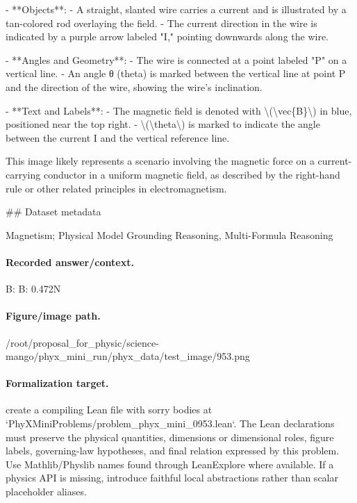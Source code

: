 - **Objects**:
  - A straight, slanted wire carries a current and is illustrated by a tan-colored rod overlaying the field.
  - The current direction in the wire is indicated by a purple arrow labeled "I," pointing downwards along the wire.

- **Angles and Geometry**:
  - The wire is connected at a point labeled "P" on a vertical line.
  - An angle θ (theta) is marked between the vertical line at point P and the direction of the wire, showing the wire’s inclination.

- **Text and Labels**:
  - The magnetic field is denoted with \textbackslash{}(\textbackslash{}vec\{B\}\textbackslash{}) in blue, positioned near the top right.
  - \textbackslash{}(\textbackslash{}theta\textbackslash{}) is marked to indicate the angle between the current I and the vertical reference line.

This image likely represents a scenario involving the magnetic force on a current-carrying conductor in a uniform magnetic field, as described by the right-hand rule or other related principles in electromagnetism.

\#\# Dataset metadata

Magnetism; Physical Model Grounding Reasoning, Multi-Formula Reasoning

\paragraph{Recorded answer/context.}
B: B: 0.472N

\paragraph{Figure/image path.}
/root/proposal\_for\_physic/science-mango/phyx\_mini\_run/phyx\_data/test\_image/953.png

\paragraph{Formalization target.}
create a compiling Lean file with sorry bodies at `PhyXMiniProblems/problem\_phyx\_mini\_0953.lean`. The Lean declarations must preserve the physical quantities, dimensions or dimensional roles, figure labels, governing-law hypotheses, and final relation expressed by this problem.
Use Mathlib/Physlib names found through LeanExplore where available. If a physics API is missing, introduce faithful local abstractions rather than scalar placeholder aliases.

